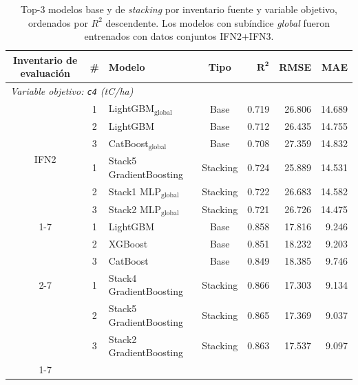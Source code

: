 \begin{table}[htbp]
    \centering
    \caption{Top-3 modelos base y de \textit{stacking} por inventario fuente y variable objetivo, ordenados por $R^2$ descendente. Los modelos con subíndice \textit{global} fueron entrenados con datos conjuntos IFN2$+$IFN3.}
    \label{tab:top3_modelos}
    \small
    \renewcommand{\arraystretch}{1.1}
    \begin{tabular}{cclcrrr}
        \toprule
        \textbf{Inventario de evaluación} & \textbf{\#} & \textbf{Modelo} & \textbf{Tipo} & $\boldsymbol{R^2}$ & \textbf{RMSE} & \textbf{MAE} \\
        \midrule
        \multicolumn{7}{l}{\textit{Variable objetivo: \texttt{c4} (tC/ha)}} \\
        \midrule
        \multirow{6}{*}{IFN2}
            & 1 & LightGBM$_{\text{global}}$             & Base     & 0.719 & 26.806 & 14.689 \\
            & 2 & LightGBM                               & Base     & 0.712 & 26.435 & 14.755 \\
            & 3 & CatBoost$_{\text{global}}$             & Base     & 0.708 & 27.359 & 14.832 \\
        \cmidrule{2-7}
            & 1 & Stack5 GradientBoosting                & Stacking & 0.724 & 25.889 & 14.531 \\
            & 2 & Stack1 MLP$_{\text{global}}$           & Stacking & 0.722 & 26.683 & 14.582 \\
            & 3 & Stack2 MLP$_{\text{global}}$           & Stacking & 0.721 & 26.726 & 14.475 \\
        \cmidrule{1-7}
        \multirow{6}{*}{IFN3}
            & 1 & LightGBM                               & Base     & 0.858 & 17.816 &  9.246 \\
            & 2 & XGBoost                                & Base     & 0.851 & 18.232 &  9.203 \\
            & 3 & CatBoost                               & Base     & 0.849 & 18.385 &  9.746 \\
        \cmidrule{2-7}
            & 1 & Stack4 GradientBoosting                & Stacking & 0.866 & 17.303 &  9.134 \\
            & 2 & Stack5 GradientBoosting                & Stacking & 0.865 & 17.369 &  9.037 \\
            & 3 & Stack2 GradientBoosting                & Stacking & 0.863 & 17.537 &  9.097 \\
        \cmidrule{1-7}
        \multirow{6}{*}{IFN2$+$IFN3}

\end{tabular}
\end{table}
